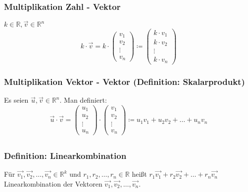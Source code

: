 \documentclass{article}
\begin{document}
  \subsubsection{Multiplikation Zahl - Vektor}
  $k \in \mathbb{R}, \vec{v} \in \mathbb{R}^n$
  \begin{equation*}
  	k \cdot \vec{v} = k \cdot 
  	\begin{pmatrix}
  		v_1 \\
  		v_2 \\
  		\vdots \\
  		v_n
  	\end{pmatrix}
  	\coloneqq 
  	\begin{pmatrix}
  		k \cdot v_1 \\
  		k \cdot v_2 \\
  		\vdots \\
  		k \cdot v_n
  	\end{pmatrix}
  \end{equation*}
  
  \subsubsection{Multiplikation Vektor - Vektor (Definition: Skalarprodukt)}
  Es seien $\vec{u}, \vec{v} \in \mathbb{R}^n$. Man definiert: 
  \begin{equation*}
  	\vec{u} \cdot \vec{v} = 
  	\begin{pmatrix}
  		u_1 \\
  		u_2 \\
  		\vdots \\
  		u_n
  	\end{pmatrix}
  	\cdot 
  	\begin{pmatrix}
  		v_1 \\
  		v_2 \\
  		\vdots \\
  		v_n
  	\end{pmatrix}
  	\coloneqq u_1 v_1 + u_2 v_2 + \ldots + u_n v_n
  \end{equation*}
  
  \subsection{}
  
  \subsubsection{Definition: Linearkombination}
  Für $\vec{v_1}, \vec{v_2}, \ldots, \vec{v_n} \in \mathbb{R}^k$ und $r_1, r_2, \ldots, r_n \in \mathbb{R}$ heißt $r_1 \vec{v_1} + r_2 \vec{v_2} + \ldots + r_n \vec{v_n}$ Linearkombination der Vektoren $\vec{v_1}, \vec{v_2}, \ldots, \vec{v_n}$.
  
\end{document}
